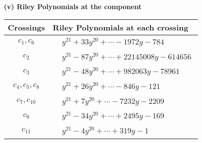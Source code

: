 \documentclass[1p]{elsarticle_modified}
\theoremstyle{definition}
\begin{document}
\flushleft \textbf{(v) Riley Polynomials at the component}\newline \\
\begin{tabular}{m{50pt}|m{274pt}}
Crossings & \hspace{64pt}Riley Polynomials at each crossing \\
\hline $$\begin{aligned}c_{1},c_{6}\end{aligned}$$&$\begin{aligned}
&y^{21}+33 y^{20}+\cdots-1972 y-784
\end{aligned}$\\
\hline $$\begin{aligned}c_{2}\end{aligned}$$&$\begin{aligned}
&y^{21}-87 y^{20}+\cdots+22145008 y-614656
\end{aligned}$\\
\hline $$\begin{aligned}c_{3}\end{aligned}$$&$\begin{aligned}
&y^{21}-48 y^{20}+\cdots+982063 y-78961
\end{aligned}$\\
\hline $$\begin{aligned}c_{4},c_{5},c_{8}\end{aligned}$$&$\begin{aligned}
&y^{21}+26 y^{20}+\cdots-846 y-121
\end{aligned}$\\
\hline $$\begin{aligned}c_{7},c_{10}\end{aligned}$$&$\begin{aligned}
&y^{21}+7 y^{20}+\cdots-7232 y-2209
\end{aligned}$\\
\hline $$\begin{aligned}c_{9}\end{aligned}$$&$\begin{aligned}
&y^{21}-34 y^{20}+\cdots+2495 y-169
\end{aligned}$\\
\hline $$\begin{aligned}c_{11}\end{aligned}$$&$\begin{aligned}
&y^{21}-4 y^{20}+\cdots+319 y-1
\end{aligned}$\\
\hline
\end{tabular}\\~\\
\end{document}
